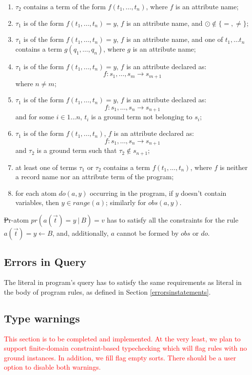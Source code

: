 \documentclass[12pt, letterpaper]{article}
\begin{document}
\begin{enumerate}[label=(\arabic*),itemsep=5pt]
  
\item $\tau_2$ contains a term of the form $f(t_1,\ldots,t_n)$, where $f$ is an attribute name;
\item $\tau_1$ is of the form $f(t_1,\ldots,t_n) = y$, $f$ is an attribute name, and $\odot \not\in\{=,\not=\}$;
\item $\tau_1$ is of the form $f(t_1,\ldots,t_n) = y$, $f$ is an attribute name, and one of $t_1,\ldots t_n$ contains a term $g(q_1,\ldots,q_n)$, where $g$ is an attribute name;
\item $\tau_1$ is of the form $f(t_1,\ldots,t_n) = y$, $f$ is an attribute declared as:
  $$f: s_1,\ldots,s_m \rightarrow s_{m+1}$$
  where $n \not=m$;
  
\item $\tau_1$ is of the form $f(t_1,\ldots,t_n) = y$, $f$ is an attribute declared as:
  $$f: s_1,\ldots,s_n \rightarrow s_{n+1}$$
  and for some $i \in 1...n$, $t_i$ is a ground term not belonging to $s_i$;
  
\item $\tau_1$ is of the form $f(t_1,\ldots,t_n)$, $f$ is an attribute declared as:
  $$f: s_1,\ldots,s_n \rightarrow s_{n+1}$$
  and $\tau_2$ is a ground term such that $\tau_2 \not\in s_{n+1}$;
\item at least one of terms $\tau_1$ or $\tau_2$ contains a term $f(t_1,\ldots,t_n)$, where $f$ is neither a record name nor an attribute term of the program;
\item for each atom $do(a,y)$ occurring in the program, if $y$ doesn't contain variables, then $y \in range(a)$; similarly for $obs(a,y)$.
\end{enumerate}

\st
Pr-atom $pr(a(\vec{t}) = y~|~B ) = v$ has to satisfy all the constraints for the rule $a(\vec{t}) = y \leftarrow B$, and, additionally, $a$ cannot be formed by $obs$ or $do$.

\subsection{Errors in Query}
The literal in program's query has to satisfy the same requirements as literal in the body of program rules, as defined in Section \ref{errorsinstatements}.


\subsection{Type warnings}\label{type_warnings}

\textcolor{red}{This section is to be completed and implemented. At the very least, we plan to support
  finite-domain constraint-based typechecking which will flag rules with no ground instances. In addition, we fill flag empty sorts. There should be a user option to disable both warnings.}



\end{document}
